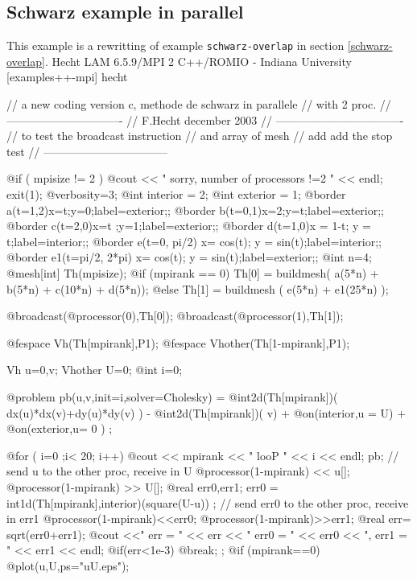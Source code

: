 \documentclass[a4paper,twoside,12pt]{book}
\begin{document}
\subsection{Schwarz example in parallel}
This example is a rewritting of example \texttt{schwarz-overlap}
in section \ref{schwarz-overlap}.
%
 Hecht%
LAM 6.5.9/MPI 2 C++/ROMIO - Indiana University
[examples++-mpi] hecht%
\eFF

\bFF
//  a new coding version c,   methode de schwarz in parallele \hfilll
// with 2 proc. \hfilll
//  ------------------------------- \hfilll
// F.Hecht december 2003 \hfilll
// ---------------------------------- \hfilll
//  to test the broadcast instruction \hfilll
//  and array of mesh  \hfilll
//  add add the stop test \hfilll
//  --------------------------------- \hfilll

@if ( mpisize != 2 ) {
    @cout << " sorry, number of processors !=2 " << endl;
     exit(1);}
@verbosity=3;
@int interior = 2;
@int exterior = 1;
@border a(t=1,2){x=t;y=0;label=exterior;};
@border b(t=0,1){x=2;y=t;label=exterior;};
@border c(t=2,0){x=t ;y=1;label=exterior;};
@border d(t=1,0){x = 1-t; y = t;label=interior;};
@border e(t=0, pi/2){ x= cos(t); y = sin(t);label=interior;};
@border e1(t=pi/2, 2*pi){ x= cos(t); y = sin(t);label=exterior;};
@int n=4;
@mesh[int]  Th(mpisize);
@if (mpirank == 0)
 Th[0] = buildmesh( a(5*n) + b(5*n) + c(10*n) + d(5*n));
@else
 Th[1] = buildmesh ( e(5*n) + e1(25*n) );

@broadcast(@processor(0),Th[0]);
@broadcast(@processor(1),Th[1]);

@fespace Vh(Th[mpirank],P1);
@fespace Vhother(Th[1-mpirank],P1);

Vh u=0,v;
Vhother U=0;
@int i=0;

@problem pb(u,v,init=i,solver=Cholesky) =
    @int2d(Th[mpirank])( dx(u)*dx(v)+dy(u)*dy(v) )
  - @int2d(Th[mpirank])( v)
  + @on(interior,u = U)  +  @on(exterior,u= 0 ) ;

@for ( i=0 ;i< 20; i++)
{
  @cout << mpirank << " looP " << i << endl;
   pb;
   //  send u  to the other proc, receive in U
   @processor(1-mpirank) << u[];   @processor(1-mpirank) >> U[];
   @real err0,err1;
   err0 = int1d(Th[mpirank],interior)(square(U-u)) ;
   // send err0  to the other proc, receive in err1
   @processor(1-mpirank)<<err0;   @processor(1-mpirank)>>err1;
   @real err= sqrt(err0+err1);
   @cout <<" err = " << err << " err0 = " << err0
         << ", err1 = " << err1 << endl;
   @if(err<1e-3) @break;
};
@if (mpirank==0)
    @plot(u,U,ps="uU.eps");
\eFF
\end{document}
